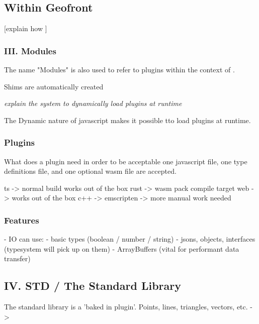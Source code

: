 


\subsection{Within Geofront}



[explain how ]


\subsubsection*{III. Modules} 


The name "Modules" is also used to refer to plugins within the context of \geofront{}.

Shims are automatically created

\emph{explain the system to dynamically load plugins at runtime}

The Dynamic nature of javascript makes it possible tto load plugins at runtime. 

  

\subsubsection{Plugins}
What does a plugin need in order to be acceptable
one javascript file, one type definitions file, and one optional wasm file are accepted. 

ts -> normal build works out of the box
rust -> wasm pack compile target web -> works out of the box 
c++ -> emscripten -> more manual work needed 

\subsubsection{Features}
- IO can use:
  - basic types (boolean / number / string)
  - jsons, objects, interfaces (typesystem will pick up on them)
  - ArrayBuffers (vital for performant data transfer)




\subsection{IV. STD / The Standard Library}

The standard library is a 'baked in plugin'.
Points, lines, triangles, vectors, etc.
-> 

